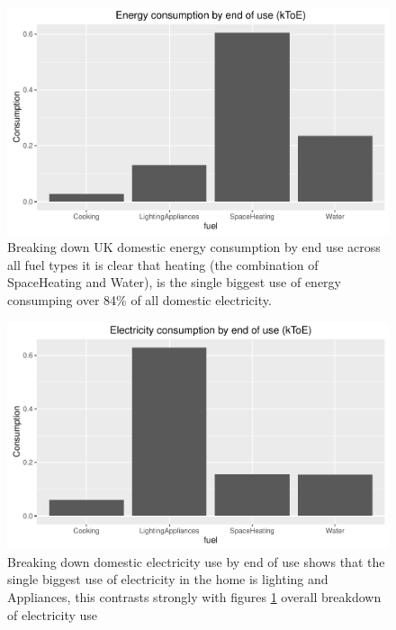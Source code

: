 \begin{figure}
    \centering
    \includegraphics[width =\textwidth]{Figures/Appendix/DomConsumType}
    \caption[Domestic energy consumption by end of use]{Breaking down UK domestic energy consumption by end use across all fuel types it is clear that heating (the combination of SpaceHeating and Water), is the single biggest use of energy consumping over 84\% of all domestic electricity.}
    \label{fig:DomConsumType}
\end{figure}

\begin{figure}
    \centering
    \includegraphics[width =\textwidth]{Figures/Appendix/DomElConsumType}
    \caption[Domestic electricity consumption by end of use]{Breaking down domestic electricity use by end of use shows that the single biggest use of electricity in the home is lighting and Appliances, this contrasts strongly with figures \ref{fig:DomConsumType} overall breakdown of electricity use}
    \label{fig:DomElConsumType}
\end{figure}

